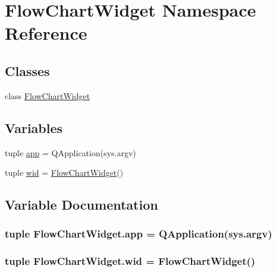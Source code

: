 \hypertarget{namespaceFlowChartWidget}{}\section{Flow\+Chart\+Widget Namespace Reference}
\label{namespaceFlowChartWidget}
\subsection*{Classes}
\begin{DoxyCompactItemize}
\item 
class \hyperlink{classFlowChartWidget_1_1FlowChartWidget}{Flow\+Chart\+Widget}
\end{DoxyCompactItemize}
\subsection*{Variables}
\begin{DoxyCompactItemize}
\item 
tuple \hyperlink{namespaceFlowChartWidget_af3fd2fafce324a6b37c8a4330f6497ee}{app} = Q\+Application(sys.\+argv)
\item 
tuple \hyperlink{namespaceFlowChartWidget_a2efbe3f3bb5482fd4aa497f2d8983a77}{wid} = \hyperlink{classFlowChartWidget_1_1FlowChartWidget}{Flow\+Chart\+Widget}()
\end{DoxyCompactItemize}


\subsection{Variable Documentation}
\hypertarget{namespaceFlowChartWidget_af3fd2fafce324a6b37c8a4330f6497ee}{}
\subsubsection[{app}]{\setlength{\rightskip}{0pt plus 5cm}tuple Flow\+Chart\+Widget.\+app = Q\+Application(sys.\+argv)}\label{namespaceFlowChartWidget_af3fd2fafce324a6b37c8a4330f6497ee}
\hypertarget{namespaceFlowChartWidget_a2efbe3f3bb5482fd4aa497f2d8983a77}{}
\subsubsection[{wid}]{\setlength{\rightskip}{0pt plus 5cm}tuple Flow\+Chart\+Widget.\+wid = {\bf Flow\+Chart\+Widget}()}\label{namespaceFlowChartWidget_a2efbe3f3bb5482fd4aa497f2d8983a77}

